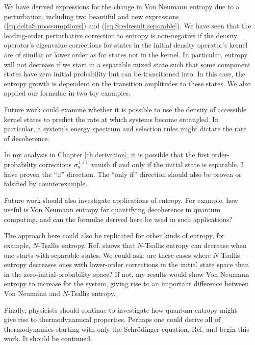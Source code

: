 We have derived expressions for the change in Von Neumann entropy due to a perturbation, including two beautiful and new expressions (\ref{eq.deltaS.noassumptions}) and (\ref{eq.Sredresult.separable}). We have seen that the leading-order perturbative correction to entropy is non-negative if the density operator's eigenvalue corrections for states in the initial density operator's kernel are of similar or lower order as for states not in the kernel. In particular, entropy will not decrease if we start in a separable mixed state such that some component states have zero initial probability but can be transitioned into. In this case, the entropy growth is dependent on the transition amplitudes to these states. We also applied our formulae in two toy examples.

Future work could examine whether it is possible to use the density of accessible kernel states to predict the rate at which systems become entangled. In particular, a system’s energy spectrum and selection rules might dictate the rate of decoherence.

In my analysis in Chapter \ref{ch.derivation}, it is possible that the first order-probability corrections \(\sigma_n^{(1)}\) vanish if and only if the initial state is separable. I have proven the ``if'' direction. The ``only if'' direction should also be proven or falsified by counterexample.

Future work should also investigate applications of entropy. For example, how useful is Von Neumann entropy for quantifying decoherence in quantum computing, and can the formulae derived here be used in such applications? 

The approach here could also be replicated for other kinds of entropy, for example, \(N\)-Tsallis entropy. Ref. \cite{cheung} shows that \(N\)-Tsallis entropy can decrease when one starts with separable states. We could ask: are these cases where \(N\)-Tsallis entropy decreases ones with lower-order corrections in the initial state space than in the zero-initial-probability space? If not, my results would show Von Neumann entropy to increase for the system, giving rise to an important difference between Von Neumann and \(N\)-Tsallis entropy.

Finally, physicists should continue to investigate how quantum entropy might give rise to thermodynamical properties. Perhaps one could derive all of thermodynamics starting with only the Schrödinger equation. Ref. \cite{bracken} and \cite{heusler} begin this work. It should be continued.
